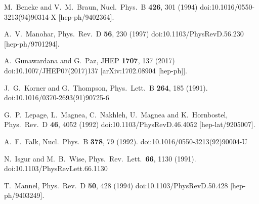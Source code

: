 \begin{thebibliography}{99}
  M.~Beneke and V.~M.~Braun,
  Nucl.\ Phys.\ B {\bf 426}, 301 (1994)
  doi:10.1016/0550-3213(94)90314-X
  [hep-ph/9402364].
  
  
  A.~V.~Manohar,
  Phys.\ Rev.\ D {\bf 56}, 230 (1997)
  doi:10.1103/PhysRevD.56.230
  [hep-ph/9701294].
  
  A.~Gunawardana and G.~Paz,
  JHEP {\bf 1707}, 137 (2017)
  doi:10.1007/JHEP07(2017)137
  [arXiv:1702.08904 [hep-ph]].
 
  J.~G.~Korner and G.~Thompson,
  Phys.\ Lett.\ B {\bf 264}, 185 (1991).
  doi:10.1016/0370-2693(91)90725-6
  
  G.~P.~Lepage, L.~Magnea, C.~Nakhleh, U.~Magnea and K.~Hornbostel,
  Phys.\ Rev.\ D {\bf 46}, 4052 (1992)
  doi:10.1103/PhysRevD.46.4052
  [hep-lat/9205007].

  A.~F.~Falk,
  Nucl.\ Phys.\ B {\bf 378}, 79 (1992).
  doi:10.1016/0550-3213(92)90004-U
  
  N.~Isgur and M.~B.~Wise,
  Phys.\ Rev.\ Lett.\  {\bf 66}, 1130 (1991).
  doi:10.1103/PhysRevLett.66.1130
    
  T.~Mannel,
  Phys.\ Rev.\ D {\bf 50}, 428 (1994)
  doi:10.1103/PhysRevD.50.428
  [hep-ph/9403249].
  

\end{thebibliography}
